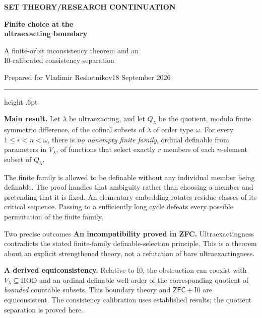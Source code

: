 \documentclass[11pt,letterpaper]{article}
\theoremstyle{definition}
\newcommand{\ZFC}{\mathsf{ZFC}}
\newcommand{\HOD}{\mathrm{HOD}}
\newcommand{\Izero}{\mathrm{I0}}
\begin{document}
\thispagestyle{empty}
{\sffamily\bfseries\small\color{Olive}SET THEORY\quad /\quad RESEARCH CONTINUATION}

\vspace{13pt}
{\fontsize{28}{31}\selectfont\bfseries\color{Forest}Finite choice at the\\ ultraexacting boundary\par}
\vspace{10pt}
{\fontsize{14}{18}\selectfont A finite-orbit inconsistency theorem and an\\ I0-calibrated consistency separation\par}
\vspace{14pt}
{\color{Muted}Prepared for Vladimir Reshetnikov\hfill 18 September 2026\par}
\vspace{3pt}
{\color{Sage}\hrule height .6pt}
\vspace{12pt}

\textbf{Main result.} Let $\lambda$ be ultraexacting, and let $Q_\lambda$ be the quotient, modulo finite symmetric difference, of the cofinal subsets of $\lambda$ of order type $\omega$. For every $1\leq r<n<\omega$, there is \emph{no nonempty finite family}, ordinal definable from parameters in $V_\lambda$, of functions that select exactly $r$ members of each $n$-element subset of $Q_\lambda$.

The finite family is allowed to be definable without any individual member being definable. The proof handles that ambiguity rather than choosing a member and pretending that it is fixed. An elementary embedding rotates residue classes of its critical sequence. Passing to a sufficiently long cycle defeats every possible permutation of the finite family.

\begin{assessment}{Two precise outcomes}
\textbf{An incompatibility proved in ZFC.} Ultraexactingness contradicts the stated finite-family definable-selection principle. This is a theorem about an explicit strengthened theory, not a refutation of bare ultraexactingness.

\textbf{A derived equiconsistency.} Relative to $\Izero$, the obstruction can coexist with $V_\lambda\subseteq\HOD$ and an ordinal-definable well-order of the corresponding quotient of \emph{bounded} countable subsets. This boundary theory and $\ZFC+\Izero$ are equiconsistent. The consistency calibration uses established results; the quotient separation is proved here.
\end{assessment}
\end{document}
